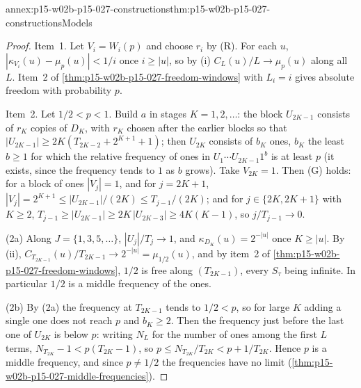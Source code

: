 \begin{annexitem}{annex:p15-w02b-p15-027-constructions}{thm:p15-w02b-p15-027-constructions}{Models}
\begin{proof}
Item~1. Let \(V_i=W_i(p)\) and choose \(r_i\) by (R). For each \(u\),
\(|\kappa_{V_i}(u)-\mu_p(u)|<1/i\) once \(i\geq|u|\), so by (i)
\(C_L(u)/L\to\mu_p(u)\) along all \(L\). Item~2 of
\cref{thm:p15-w02b-p15-027-freedom-windows} with \(L_i=i\) gives
absolute freedom with probability \(p\).

Item~2. Let \(1/2<p<1\). Build \(a\) in stages \(K=1,2,\ldots\): the
block \(U_{2K-1}\) consists of \(r_K\) copies of \(D_K\), with \(r_K\)
chosen after the earlier blocks so that
\(|U_{2K-1}|\geq2K(T_{2K-2}+2^{K+1}+1)\); then \(U_{2K}\) consists of
\(b_K\) ones, \(b_K\) the least \(b\geq1\) for which the relative frequency
of ones in \(U_1\cdots U_{2K-1}1^b\) is at least \(p\) (it exists, since
the frequency tends to \(1\) as \(b\) grows). Take \(V_{2K}=1\). Then
(G) holds: for a block of ones \(|V_j|=1\), and for \(j=2K+1\),
\(|V_j|=2^{K+1}\leq|U_{2K-1}|/(2K)\leq T_{j-1}/(2K)\); and for
\(j\in\{2K,2K+1\}\) with \(K\geq2\),
\(T_{j-1}\geq|U_{2K-1}|\geq2K\,|U_{2K-3}|\geq4K(K-1)\), so
\(j/T_{j-1}\to0\).

(2a) Along \(J=\{1,3,5,\ldots\}\), \(|U_j|/T_j\to1\), and
\(\kappa_{D_K}(u)=2^{-|u|}\) once \(K\geq|u|\). By (ii),
\(C_{T_{2K-1}}(u)/T_{2K-1}\to2^{-|u|}=\mu_{1/2}(u)\), and by item~2 of
\cref{thm:p15-w02b-p15-027-freedom-windows}, \(1/2\) is free along
\((T_{2K-1})\), every \(S_\tau\) being infinite. In particular \(1/2\) is
a middle frequency of the ones.

(2b) By (2a) the frequency at \(T_{2K-1}\) tends to \(1/2<p\), so for
large \(K\) adding a single one does not reach \(p\) and \(b_K\geq2\).
Then the frequency just before the last one of \(U_{2K}\) is below \(p\):
writing \(N_L\) for the number of ones among the first \(L\) terms,
\(N_{T_{2K}}-1<p(T_{2K}-1)\), so
\(p\leq N_{T_{2K}}/T_{2K}<p+1/T_{2K}\). Hence \(p\) is a middle frequency,
and since \(p\neq1/2\) the frequencies have no limit
(\cref{thm:p15-w02b-p15-027-middle-frequencies}).


\end{proof}
\end{annexitem}
